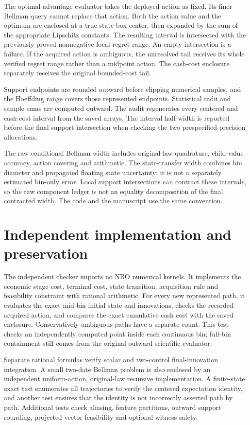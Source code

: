 The optimal-advantage evaluator takes the deployed action as fixed. Its finer Bellman query cannot replace that action. Both the action value and the optimum are enclosed at a true-state-box center, then expanded by the sum of the appropriate Lipschitz constants. The resulting interval is intersected with the previously proved nonnegative local-regret range. An empty intersection is a failure. If the acquired action is ambiguous, the unresolved tail receives its whole verified regret range rather than a midpoint action. The cash-cost enclosure separately receives the original bounded-cost tail.

Support endpoints are rounded outward before clipping numerical samples, and the Hoeffding range covers those represented endpoints. Statistical radii and sample sums are computed outward. The audit regenerates every centered and cash-cost interval from the saved arrays. The interval half-width is reported before the final support intersection when checking the two prespecified precision allocations.

The raw conditional Bellman width includes original-law quadrature, child-value accuracy, action covering and arithmetic. The state-transfer width combines bin diameter and propagated floating state uncertainty; it is not a separately estimated bin-only error. Local support intersections can contract these intervals, so the raw component ledger is not an equality decomposition of the final contracted width. The code and the manuscript use the same convention.

\section{Independent implementation and preservation}\label{supp:independent69}
The independent checker imports no NBO numerical kernels. It implements the economic stage cost, terminal cost, state transition, acquisition rule and feasibility constraint with rational arithmetic. For every new represented path, it evaluates the exact mid-bin initial state and innovations, checks the recorded acquired action, and compares the exact cumulative cash cost with the saved enclosure. Conservatively ambiguous paths have a separate count. This test checks an independently computed point inside each continuous bin; full-bin containment still comes from the original outward scientific evaluator.

Separate rational formulas verify scalar and two-control final-innovation integration. A small two-date Bellman problem is also enclosed by an independent uniform-action, original-law recursive implementation. A finite-state exact test enumerates all trajectories to verify the centered expectation identity, and another test ensures that the identity is not incorrectly asserted path by path. Additional tests check aliasing, feature partitions, outward support rounding, projected vector feasibility and optional-witness safety.

